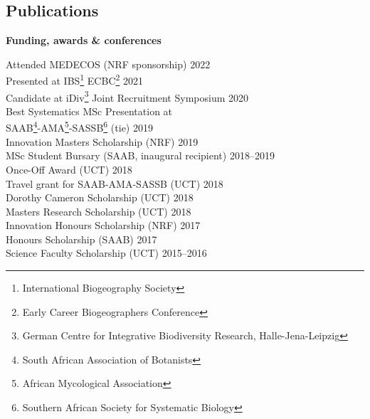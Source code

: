 \documentclass[10pt]{article}
\begin{document}


\bigskip



\subsection*{Publications} %



\hrulefill

\begin{multicols}{2} %

\textbf{Funding, awards \& conferences} %

Attended MEDECOS        {\small (NRF sponsorship)} \hfill {\small       2022} \\
Presented at IBS\footnote{International
  Biogeography Society} ECBC\footnote{Early Career
  Biogeographers Conference}                       \hfill {\small       2021} \\
Candidate at iDiv\footnote{German Centre for
  Integrative Biodiversity Research,
  Halle-Jena-Leipzig} Joint Recruitment Symposium  \hfill {\small       2020} \\
Best Systematics MSc Presentation at                                          \\
\hspace{2em} SAAB\footnote{South African
  Association of Botanists}-AMA\footnote{African
  Mycological Association}-SASSB\footnote{Southern
  African Society for Systematic Biology}
                                   {\small  (tie)} \hfill {\small       2019} \\
Innovation Masters Scholarship     {\small  (NRF)} \hfill {\small       2019} \\
MSc Student Bursary
              {\small (SAAB, inaugural recipient)} \hfill {\small 2018--2019} \\
Once-Off Award                     {\small  (UCT)} \hfill {\small       2018} \\
Travel grant for SAAB-AMA-SASSB    {\small  (UCT)} \hfill {\small       2018} \\
Dorothy Cameron Scholarship        {\small  (UCT)} \hfill {\small       2018} \\
Masters Research Scholarship       {\small  (UCT)} \hfill {\small       2018} \\
Innovation Honours Scholarship     {\small  (NRF)} \hfill {\small       2017} \\
Honours Scholarship                {\small (SAAB)} \hfill {\small       2017} \\
Science Faculty Scholarship        {\small  (UCT)} \hfill {\small 2015--2016}


\end{multicols}
\end{document}
